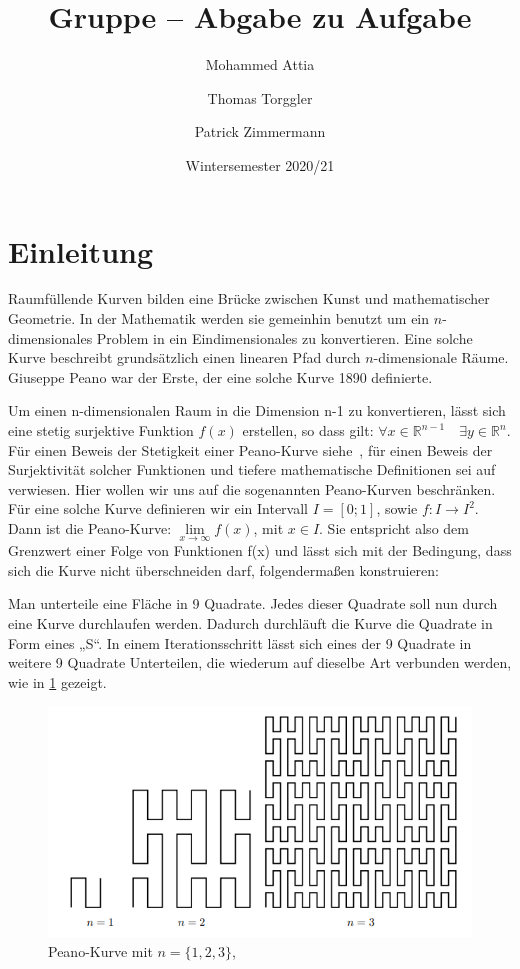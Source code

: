 \documentclass[course=asp]{aspdoc}
\author{Mohammed Attia \and Thomas Torggler \and Patrick Zimmermann}
\date{Wintersemester 2020/21} %
\title{Gruppe \theGroup{} -- Abgabe zu Aufgabe \theNumber}
\begin{document}
\maketitle

\newpage
\section{Einleitung} \label{Einleitung}

Raumf\"ullende Kurven bilden eine Br\"ucke zwischen Kunst und mathematischer Geometrie. In der Mathematik werden sie gemeinhin benutzt um ein $n$-dimensionales Problem in ein Eindimensionales zu konvertieren. Eine solche Kurve beschreibt grunds\"atzlich einen linearen Pfad durch $n$-dimensionale R\"aume. Giuseppe Peano war der Erste, der eine solche Kurve 1890 definierte.

Um einen n-dimensionalen Raum in die Dimension n-1 zu konvertieren, l\"asst sich eine stetig surjektive Funktion $f(x)$ erstellen, so dass gilt: $\forall x \in \mathbb{R}^{n-1} \quad \exists y \in \mathbb{R}^n$. F\"ur einen Beweis der Stetigkeit einer Peano-Kurve siehe~\cite{stetigkeitsBeweis}, f\"ur einen Beweis der Surjektivit\"at solcher Funktionen und tiefere mathematische Definitionen sei auf ~\cite{surjektivBeweis} verwiesen. Hier wollen wir uns auf die sogenannten Peano-Kurven beschr\"anken. F\"ur eine solche Kurve definieren wir ein Intervall $I = [0;1]$, sowie  $f: I \rightarrow I^2 $. Dann ist die Peano-Kurve: $\lim\limits_{x \to \infty}f(x)$, mit $x \in I$. Sie entspricht also dem Grenzwert einer Folge von Funktionen f(x) und l\"asst sich mit der Bedingung, dass sich die Kurve nicht \"uberschneiden darf, folgendermaßen konstruieren:

Man unterteile eine Fl\"ache in 9 Quadrate. Jedes dieser Quadrate soll nun durch eine Kurve durchlaufen werden. Dadurch durchl\"auft die Kurve die Quadrate in Form eines „S“.
In einem Iterationsschritt l\"asst sich eines der 9 Quadrate in weitere 9 Quadrate Unterteilen, die wiederum auf dieselbe Art verbunden werden, wie in \ref{Abb:Peano} gezeigt.

\begin{figure} [ht] %
\centering
\includegraphics[scale=0.9]{PeanoBsp.png}
\caption{Peano-Kurve mit $n = \{1, 2, 3\}$, ~\cite{aufgabenstellung}}\label{Abb:Peano}
\end{figure}
\end{document}
